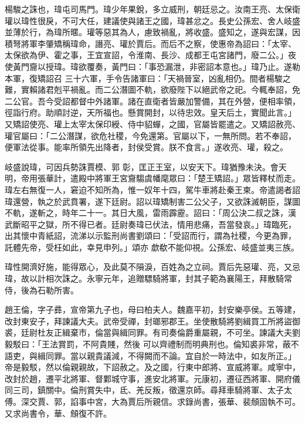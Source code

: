 \begin{pinyinscope}
 楊駿之誅也，瑋屯司馬門。瑋少年果銳，多立威刑，朝廷忌之。汝南王亮、太保衛瓘以瑋性很戾，不可大任，建議使與諸王之國，瑋甚忿之。長史公孫宏、舍人岐盛並薄於行，為瑋所暱。瓘等惡其為人，慮致禍亂，將收盛。盛知之，遂與宏謀，因積弩將軍李肇矯稱瑋命，譖亮、瓘於賈后。而后不之察，使惠帝為詔曰：「太宰、太保欲為伊、霍之事，王宜宣詔，令淮南、長沙、成都王屯宮諸門，廢二公。」夜使黃門齎以授瑋。瑋欲覆奏，黃門曰：「事恐漏泄，非密詔本意也。」瑋乃止。遂勒本軍，復矯詔召
 三十六軍，手令告諸軍曰：「天禍晉室，凶亂相仍。間者楊駿之難，實賴諸君剋平禍亂。而二公潛圖不軌，欲廢陛下以絕武帝之祀。今輒奉詔，免二公官。吾今受詔都督中外諸軍。諸在直衛者皆嚴加警備，其在外營，便相率領，徑詣行府。助順討逆，天所福也。懸賞開封，以待忠效。皇天后土，實聞此言。」又矯詔使亮、瓘上太宰太保印綬、侍中貂蟬，之國，官屬皆罷遣之。又矯詔赦亮、瓘官屬曰：「二公潛謀，欲危社稷，今免還第。官屬以下，一無所問。若不奉詔，便軍法從事。能率所領先出降者，封侯受賞。朕不食言。」遂收亮、瓘，殺之。



 岐盛說瑋，可因兵勢誅賈模、郭
 彰，匡正王室，以安天下。瑋猶豫未決。會天明，帝用張華計，遣殿中將軍王宮齎騶虞幡麾眾曰：「楚王矯詔。」眾皆釋杖而走。瑋左右無復一人，窘迫不知所為，惟一奴年十四，駕牛車將赴秦王柬。帝遣謁者詔瑋還營，執之於武賁署，遂下廷尉。詔以瑋矯制害二公父子，又欲誅滅朝臣，謀圖不軌，遂斬之，時年二十一。其日大風，雷雨霹靂。詔曰：「周公決二叔之誅，漢武斷昭平之獄，所不得已者。廷尉奏瑋已伏法，情用悲痛，吾當發哀。」瑋臨死，出其懷中青紙詔，流涕以示監刑尚書劉頌曰：「受詔而行，謂為社稷，今更為罪，託體先帝，受枉如此，幸見申列。」頌亦
 歔欷不能仰視。公孫宏、岐盛並夷三族。



 瑋性開濟好施，能得眾心，及此莫不隕淚，百姓為之立祠。賈后先惡瓘、亮，又忌瑋，故以計相次誅之。永寧元年，追贈驃騎將軍，封其子範為襄陽王，拜散騎常侍，後為石勒所害。



 趙王倫，字子彞，宣帝第九子也，母曰柏夫人。魏嘉平初，封安樂亭侯。五等建，改封東安子，拜諫議大夫。武帝受禪，封瑯邪郡王。坐使散騎將劉緝買工所將盜御裘，廷尉杜友正緝棄市，倫當與緝同罪。有司奏倫爵重屬親，不可坐。諫議大夫劉毅駁曰：「王法賞罰，不阿貴賤，然後
 可以齊禮制而明典刑也。倫知裘非常，蔽不語吏，與緝同罪。當以親貴議減，不得闕而不論。宜自於一時法中，如友所正。」帝是毅駁，然以倫親親故，下詔赦之。及之國，行東中郎將、宣威將軍。咸寧中，改封於趙，遷平北將軍、督鄴城守事，進安北將軍。元康初，遷征西將軍、開府儀同三司，鎮關中。倫刑賞失中，氐、羌反叛，徵還京師。尋拜車騎將軍、太子太傅。深交賈、郭，諂事中宮，大為賈后所親信。求錄尚書，張華、裴頠固執不可。又求尚書令，華、頠復不許。




\end{pinyinscope}
